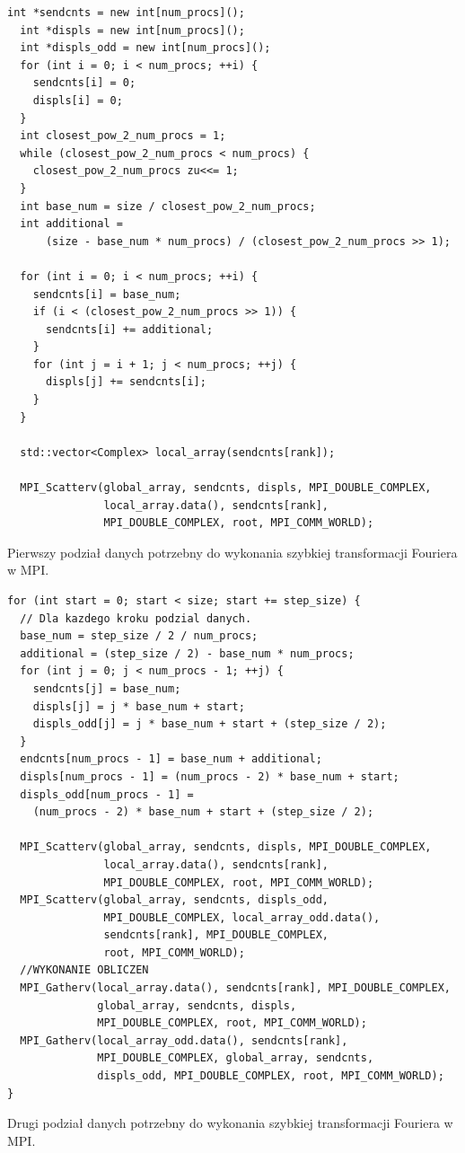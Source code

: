 \documentclass[a4paper,12pt]{book} %
\begin{document}
\begin{lstfloat}
\lstset{language=C++}
\begin{lstlisting}[frame=single]
  int *sendcnts = new int[num_procs]();
  int *displs = new int[num_procs]();
  int *displs_odd = new int[num_procs]();
  for (int i = 0; i < num_procs; ++i) {
    sendcnts[i] = 0;
    displs[i] = 0;
  }
  int closest_pow_2_num_procs = 1;
  while (closest_pow_2_num_procs < num_procs) {
    closest_pow_2_num_procs zu<<= 1;
  }
  int base_num = size / closest_pow_2_num_procs;
  int additional =
      (size - base_num * num_procs) / (closest_pow_2_num_procs >> 1);

  for (int i = 0; i < num_procs; ++i) {
    sendcnts[i] = base_num;
    if (i < (closest_pow_2_num_procs >> 1)) {
      sendcnts[i] += additional;
    }
    for (int j = i + 1; j < num_procs; ++j) {
      displs[j] += sendcnts[i];
    }
  }

  std::vector<Complex> local_array(sendcnts[rank]);

  MPI_Scatterv(global_array, sendcnts, displs, MPI_DOUBLE_COMPLEX,
               local_array.data(), sendcnts[rank],
               MPI_DOUBLE_COMPLEX, root, MPI_COMM_WORLD);
\end{lstlisting}
\caption{Pierwszy podział danych potrzebny do wykonania szybkiej transformacji Fouriera w MPI.}
\label{lst:mpi-data-split}
\end{lstfloat}

\begin{lstfloat}
\lstset{language=C++}
\begin{lstlisting}[frame=single]
for (int start = 0; start < size; start += step_size) {
  // Dla kazdego kroku podzial danych.
  base_num = step_size / 2 / num_procs;
  additional = (step_size / 2) - base_num * num_procs;
  for (int j = 0; j < num_procs - 1; ++j) {
    sendcnts[j] = base_num;
    displs[j] = j * base_num + start;
    displs_odd[j] = j * base_num + start + (step_size / 2);
  }
  endcnts[num_procs - 1] = base_num + additional;
  displs[num_procs - 1] = (num_procs - 2) * base_num + start;
  displs_odd[num_procs - 1] =
    (num_procs - 2) * base_num + start + (step_size / 2);

  MPI_Scatterv(global_array, sendcnts, displs, MPI_DOUBLE_COMPLEX,
               local_array.data(), sendcnts[rank], 
               MPI_DOUBLE_COMPLEX, root, MPI_COMM_WORLD);
  MPI_Scatterv(global_array, sendcnts, displs_odd, 
  			   MPI_DOUBLE_COMPLEX, local_array_odd.data(),
  			   sendcnts[rank], MPI_DOUBLE_COMPLEX,
               root, MPI_COMM_WORLD);
  //WYKONANIE OBLICZEN
  MPI_Gatherv(local_array.data(), sendcnts[rank], MPI_DOUBLE_COMPLEX,
              global_array, sendcnts, displs, 
              MPI_DOUBLE_COMPLEX, root, MPI_COMM_WORLD);
  MPI_Gatherv(local_array_odd.data(), sendcnts[rank], 
  			  MPI_DOUBLE_COMPLEX, global_array, sendcnts, 
  			  displs_odd, MPI_DOUBLE_COMPLEX, root, MPI_COMM_WORLD);
}

\end{lstlisting}
\caption{Drugi podział danych potrzebny do wykonania szybkiej transformacji Fouriera w MPI.}
\label{lst:mpi-data-split2}
\end{lstfloat}
\end{document}
